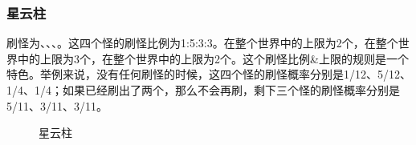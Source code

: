 \subsubsection{星云柱}
刷怪为、、、。这四个怪的刷怪比例为1:5:3:3。在整个世界中的上限为2个，在整个世界中的上限为3个，在整个世界中的上限为2个。这个刷怪比例\&上限的规则是一个特色。举例来说，没有任何刷怪的时候，这四个怪的刷怪概率分别是1/12、5/12、1/4、1/4；如果已经刷出了两个，那么不会再刷，剩下三个怪的刷怪概率分别是5/11、3/11、3/11。
\begin{figure}[!ht]
    \centering
    \caption{星云柱}
\end{figure}

